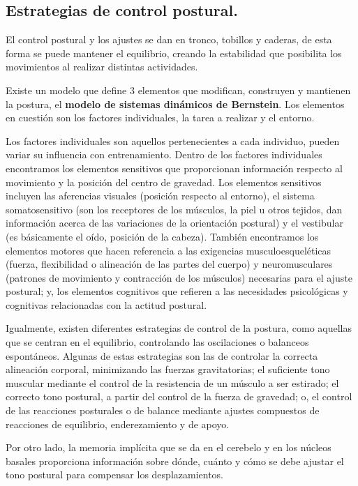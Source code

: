 \subsection{Estrategias de control postural.} 
El control postural y los ajustes se dan en tronco, tobillos y caderas, de esta forma se puede mantener el equilibrio, creando la estabilidad que posibilita los movimientos al realizar distintas actividades.

Existe un modelo que define 3 elementos que modifican, construyen y mantienen la postura, el \textbf{modelo de sistemas dinámicos de Bernstein}. Los elementos en cuestión son los factores individuales, la tarea a realizar y el entorno. 

Los factores individuales son aquellos pertenecientes a cada individuo, pueden variar su influencia con entrenamiento. Dentro de los factores individuales encontramos los elementos sensitivos que proporcionan información respecto al movimiento y la posición del centro de gravedad. Los elementos sensitivos incluyen las aferencias visuales (posición respecto al entorno), el sistema somatosensitivo (son los receptores de los músculos, la piel u otros tejidos, dan información acerca de las variaciones de la orientación postural) y el vestibular (es básicamente el oído, posición de la cabeza). También encontramos los elementos motores que hacen referencia a las exigencias musculoesqueléticas (fuerza, flexibilidad o alineación de las partes del cuerpo) y neuromusculares (patrones de movimiento y contracción de los músculos)  necesarias para el ajuste postural; y, los elementos cognitivos que refieren a las necesidades psicológicas y cognitivas relacionadas con la actitud postural.

Igualmente, existen diferentes estrategias de control de la postura, como aquellas que se centran en el equilibrio, controlando las oscilaciones o balanceos espontáneos. Algunas de estas estrategias son las de controlar la correcta alineación corporal, minimizando las fuerzas gravitatorias; el suficiente tono muscular mediante el control de la resistencia de un músculo a ser estirado; el correcto tono postural, a partir del control de la fuerza de gravedad; o, el control de las reacciones posturales o de balance mediante ajustes compuestos de reacciones de equilibrio, enderezamiento y de apoyo. 

Por otro lado, la memoria implícita que se da en el cerebelo y en los núcleos basales proporciona información sobre dónde, cuánto y cómo se debe ajustar el tono postural para compensar los desplazamientos.

